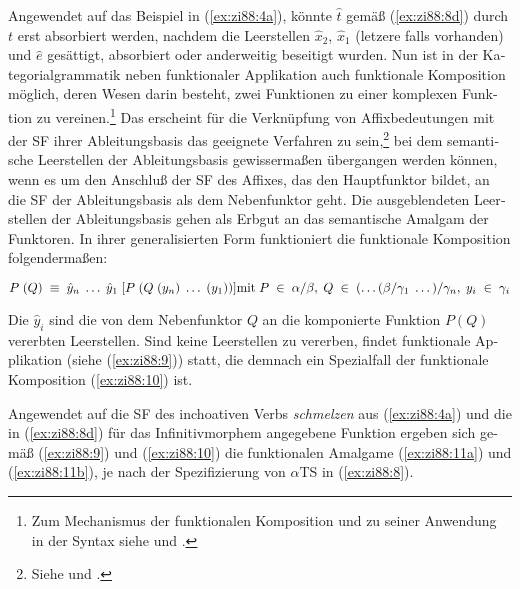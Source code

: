 \documentclass[output=paper,colorlinks,citecolor=brown, booklanguage=german]{langscibook}
\begin{document}
\begin{otherlanguage}{german}
\noindent Angewendet auf das Beispiel in (\ref{ex:zi88:4a}), könnte $\hat{t}$ gemäß (\ref{ex:zi88:8d}) durch $t$ erst absorbiert werden, nachdem die Leerstellen $\hat{x}_2$, $\hat{x}_1$ (letzere falls vorhanden) und $\hat{e}$ gesättigt, absorbiert oder anderweitig beseitigt wurden. Nun ist in der Kategorialgrammatik neben funktionaler Applikation auch funktionale Komposition möglich, deren Wesen darin besteht, zwei Funktionen zu einer komplexen Funktion zu vereinen.\footnote{Zum Mechanismus der funktionalen Komposition und zu seiner Anwendung in der Syntax siehe \citet{Ades.Steedman1982} und \citet{Steedman1985}.} Das erscheint für die Verknüpfung von Affixbedeutungen mit der SF ihrer Ableitungsbasis das geeignete Verfahren zu sein,\footnote{Siehe \citet{Moortgat1984,Moortgat1987} und \citet{Bierwisch1987b,Bierwisch1987d}.} bei dem seman\-ti\-sche Leerstellen der Ableitungsbasis gewissermaßen übergangen werden können, wenn es um den Anschluß der SF des Affixes, das den Hauptfunktor bildet, an die SF der Ableitungsbasis als dem Nebenfunktor geht. Die ausgeblendeten Leerstellen der Ableitungsbasis gehen als Erbgut an das semantische Amalgam der Funktoren. In ihrer generalisierten Form funktioniert die funktionale Komposition folgendermaßen:

\ea\label{ex:zi88:10} $P \; (Q) \; \equiv \; \hat{y}_n \; \dots \; \hat{y}_1 \; [P \; (Q \; (y_n) \; \dots \; (y_1))] \newline \text{mit} \; P \; \in \; \alpha/\beta, \; Q \; \in \; (\dots(\beta/\gamma_1 \; \dots)/\gamma_n, \; y_i \; \in \; \gamma_i$
\z 

\noindent Die $\hat{y}_i$ sind die von dem Nebenfunktor $Q$ an die komponierte Funktion $P(Q)$ vererbten Leerstellen. Sind keine Leerstellen zu vererben, findet funktionale Appli\-kation (siehe (\ref{ex:zi88:9})) statt, die demnach ein Spezialfall der funktionale Komposition (\ref{ex:zi88:10}) ist.

Angewendet auf die SF des inchoativen Verbs \textit{schmelzen} aus (\ref{ex:zi88:4a}) und die in (\ref{ex:zi88:8d}) für das Infinitivmorphem angegebene Funktion ergeben sich gemäß (\ref{ex:zi88:9}) und (\ref{ex:zi88:10}) die funktionalen Amalgame (\ref{ex:zi88:11a}) und (\ref{ex:zi88:11b}), je nach der Spezifizierung von $\alpha$TS in (\ref{ex:zi88:8}).


\end{otherlanguage}
\end{document}
